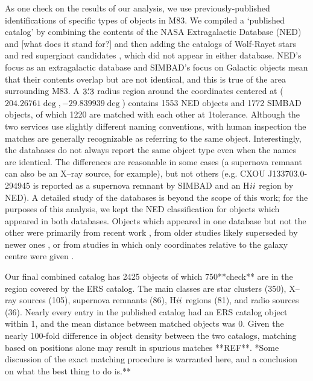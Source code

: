 As one check on the results of our analysis, we use previously-published identifications of specific types of objects in M83.
We compiled a `published catalog' by combining the contents of the NASA Extragalactic Database (NED) and
[what does it stand for?] \citep[SIMBAD][]{wenger2000} and then adding the catalogs of Wolf-Rayet stars \citep{kim12} and
red supergiant candidates \citep{williams15}, which did not appear in either database.
NED's focus as an extragalactic database and SIMBAD's focus on Galactic objects mean that their contents overlap but are not identical, 
and this is true of the area surrounding M83. A $3\hbox{$.\mkern-4mu^\prime$}3$ radius region around the coordinates centered at  ($204.26761\deg, -29.839939\deg$)
contains 1553 NED objects and 1772 SIMBAD objects, of which 1220 are matched with each other at 1\arcsec tolerance.
Although the two services use slightly different naming conventions, with human inspection the matches are generally recognizable as referring
to the same object. Interestingly, the databases do not always report the same object type even when the names are identical.
The differences are reasonable in some cases (a supernova remnant can also be an X--ray source, for example), but not others
(e.g. CXOU J133703.0-294945 is reported as a supernova remnant by SIMBAD and an H${\sc ii}$  region by NED).
A detailed study of the databases is beyond the scope of this work; for the purposes of this analysis, we kept the NED classification
for objects which appeared in both databases.
Objects which appeared in one database but not the other were primarily from recent work \citep[e.g.][]{long2014}, from
older studies likely superseded by newer ones \citep[e.g.][]{larsen1999}, or from studies in which only coordinates relative to
the galaxy centre were given \citep{rumstay83,dvpd83}.

Our final combined catalog has 2425 objects of which 750**check** are in the region covered by the ERS catalog.
The main classes are star clusters (350), X--ray sources (105), supernova remnants (86), H${\sc ii}$ regions (81),  and
radio sources (36).
Nearly every entry in the published catalog had an ERS catalog object within 1\arcsec, and the mean distance between
matched objects was 0.
Given the nearly 100-fold difference in object density between the two catalogs, matching based on positions alone may 
result in spurious matches **REF**. *Some discussion of the exact matching procedure is warranted here, and a conclusion
on what the best thing to do is.**




